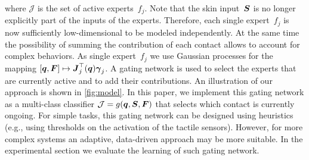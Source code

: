 	where $\mathcal{J}$ is the set of active experts~$f_j$.
	Note that the skin input~$\mathcal{\boldsymbol{S}}$ is no longer explicitly part of the inputs of the experts. %
    Therefore, each single expert~$f_j$ is now sufficiently low-dimensional to be modeled independently. At the same time the possibility of summing the contribution of each contact allows to account for complex%
    behaviors.
    As single expert~$f_j$ we use Gaussian processes for the mapping $[\boldsymbol q, \boldsymbol{F}] \mapsto {\boldsymbol J^\top_j(\boldsymbol q)} \boldsymbol{\gamma}_j$.
    A gating network is used to select the experts that are currently active and to add their contributions.    
    An illustration of our approach is shown in \fig\ref{fig:model}.
    In this paper, we implement this gating network as a multi-class classifier $\mathcal{J} = g(\boldsymbol q, \mathcal{\boldsymbol{S}},\boldsymbol{F})$ that selects which contact is currently ongoing.
	For simple tasks, this gating network can be designed using heuristics (e.g., using thresholds on the activation of the tactile sensors). 
    However, for more complex systems an adaptive, data-driven approach may be more suitable. 
    In the experimental section we evaluate the learning of such gating network.




